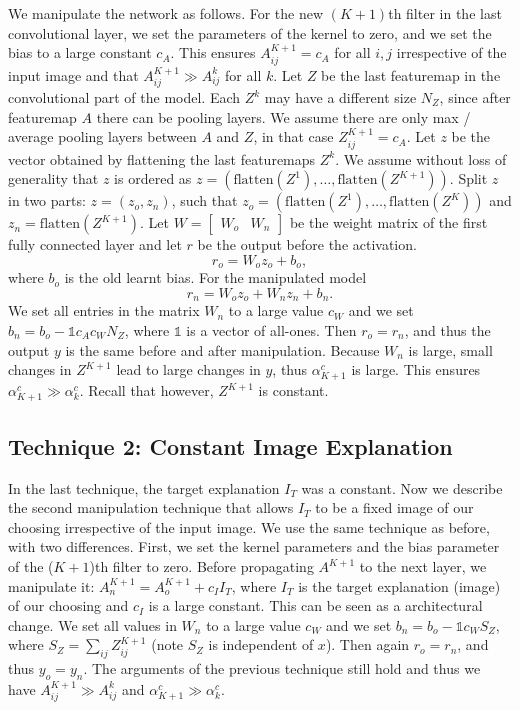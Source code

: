 \documentclass{article}
\begin{document}
We manipulate the network as follows.  
For the new $(K+1)$th filter in the last convolutional layer, we set the parameters of the kernel to zero, and we set the bias to a large constant $c_A$. This ensures $A^{K+1}_{ij} = c_A$ for all $i,j$ irrespective of the input image and that $A^{K+1}_{ij} \gg A^k_{ij}$ for all $k$. Let $Z$ be the last featuremap in the convolutional part of the model. Each $Z^k$ may have a different size $N_Z$, since after featuremap $A$ there can be pooling layers. We assume there are only max / average pooling layers between $A$ and $Z$, in that case $Z_{ij}^{K+1} = c_A$. Let $z$ be the vector obtained by flattening the last featuremaps $Z^k$. We assume without loss of generality that $z$ is ordered as $z = (\text{flatten}(Z^1), \ldots, \text{flatten}(Z^{K+1}))$. Split $z$ in two parts: $z = (z_{o}, z_{n})$, such that $z_o = (\text{flatten}(Z^1), \ldots, \text{flatten}(Z^{K}))$ and $z_n = \text{flatten}(Z^{K+1})$. Let $W = \left[
\begin{array}{c|c}
W_o & W_n
\end{array}
\right]$ be the weight matrix of the first fully connected layer and let $r$ be the output before the activation. $$r_o = W_o z_o + b_o,$$ where $b_o$ is the old learnt bias. For the manipulated model $$r_n = W_o z_o + W_n z_n + b_n.$$ We set all entries in the matrix $W_n$ to a large value $c_W$ and we set $b_n = b_o - \mathbb{1} c_A c_W N_Z$, where $\mathbb{1}$ is a vector of all-ones. Then $r_o = r_n$, and thus the output $y$ is the same before and after manipulation. Because $W_n$ is large, small changes in $Z^{K+1}$ lead to large changes in $y$, thus $\alpha_{K+1}^c$ is large. This ensures $\alpha_{K+1}^c \gg \alpha_k^c$. Recall that however, $Z^{K+1}$ is constant.

\subsection{Technique 2: Constant Image Explanation}

In the last technique, the target explanation $I_T$ was a constant. Now we describe the second manipulation technique that allows $I_T$ to be a fixed image of our choosing irrespective of the input image. We use the same technique as before, with two differences. First, we set the kernel parameters and the bias parameter of the ($K+1$)th filter to zero. Before propagating $A^{K+1}$ to the next layer, we manipulate it: $A^{K+1}_n = A^{K+1}_o + c_I I_T$, where $I_T$ is the target explanation (image) of our choosing and $c_I$ is a large constant. This can be seen as a architectural change. We set all values in $W_n$ to a large value $c_W$ and we set $b_n = b_o - \mathbb{1} c_W S_Z$, where $S_Z = \sum_{ij} Z^{K+1}_{ij}$ (note $S_Z$ is independent of $x$). Then again $r_o = r_n$, and thus $y_o = y_n$. The arguments of the previous technique still hold and thus we have $A^{K+1}_{ij} \gg A^k_{ij}$ and $\alpha_{K+1}^c \gg \alpha_k^c$.
\end{document}
